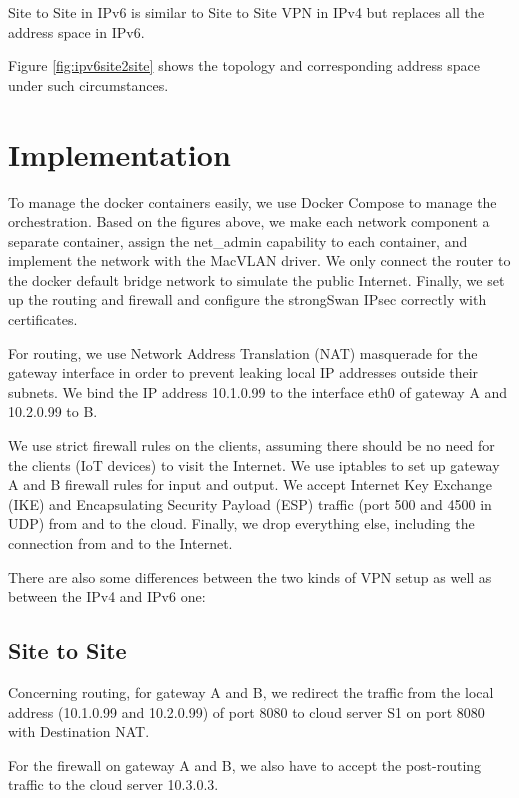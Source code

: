 \documentclass[article]{aaltoseries}
\begin{document}
Site to Site in IPv6 is similar to Site to Site VPN in IPv4 but replaces all the address space in IPv6.

Figure \ref{fig:ipv6site2site} shows the topology and corresponding address space under such circumstances.



\section{Implementation}

To manage the docker containers easily, we use Docker Compose to manage the orchestration. Based on the figures above, we make each network component a separate container, assign the net\_admin capability to each container, and implement the network with the MacVLAN driver. We only connect the router to the docker default bridge network to simulate the public Internet. Finally, we set up the routing and firewall and configure the strongSwan IPsec correctly with certificates.

For routing, we use Network Address Translation (NAT) masquerade for the gateway interface in order to prevent leaking local IP addresses outside their subnets. We bind the IP address 10.1.0.99 to the interface eth0 of gateway A and 10.2.0.99 to B.

We use strict firewall rules on the clients, assuming there should be no need for the clients (IoT devices) to visit the Internet. We use iptables to set up gateway A and B firewall rules for input and output. We accept Internet Key Exchange (IKE) and Encapsulating Security Payload (ESP) traffic (port 500 and 4500 in UDP) from and to the cloud. Finally, we drop everything else, including the connection from and to the Internet.

There are also some differences between the two kinds of VPN setup as well as between the IPv4 and IPv6 one:

\subsection{Site to Site}

Concerning routing, for gateway A and B, we redirect the traffic from the local address (10.1.0.99 and 10.2.0.99) of port 8080 to cloud server S1 on port 8080 with Destination NAT.

For the firewall on gateway A and B, we also have to accept the post-routing traffic to the cloud server 10.3.0.3.
\end{document}
